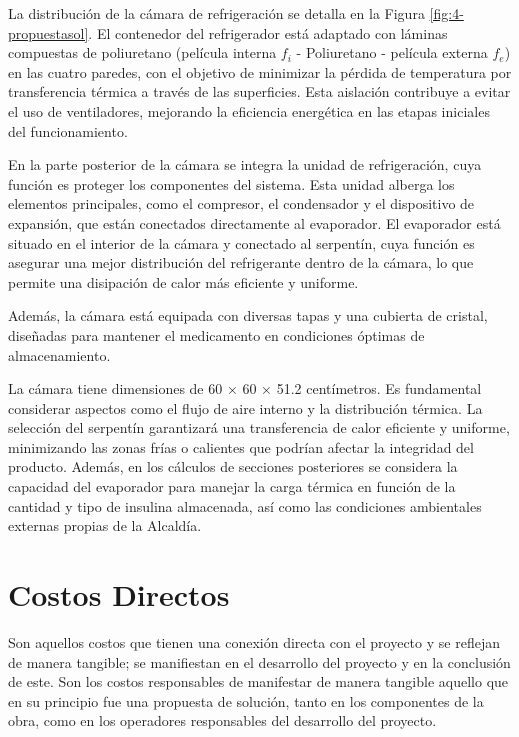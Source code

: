  
 

 \setcounter{chapter}{5}
 \setcounter{page}{111}   
 \setcounter{section}{0}
 \setcounter{figure}{0}
 \setcounter{table}{0}
La distribución de la cámara de refrigeración se detalla en la Figura \ref{fig:4-propuestasol}. El contenedor del refrigerador está adaptado con láminas compuestas de poliuretano (película interna $f_i$ - Poliuretano - película externa $f_e$) en las cuatro paredes, con el objetivo de minimizar la pérdida de temperatura por transferencia térmica a través de las superficies. Esta aislación contribuye a evitar el uso de ventiladores, mejorando la eficiencia energética en las etapas iniciales del funcionamiento.

En la parte posterior de la cámara se integra la unidad de refrigeración, cuya función es proteger los componentes del sistema. Esta unidad alberga los elementos principales, como el compresor, el condensador y el dispositivo de expansión, que están conectados directamente al evaporador. El evaporador está situado en el interior de la cámara y conectado al serpentín, cuya función es asegurar una mejor distribución del refrigerante dentro de la cámara, lo que permite una disipación de calor más eficiente y uniforme.

Además, la cámara está equipada con diversas tapas y una cubierta de cristal, diseñadas para mantener el medicamento en condiciones óptimas de almacenamiento.

La cámara tiene dimensiones de 60 × 60 × 51.2 centímetros. Es fundamental considerar aspectos como el flujo de aire interno y la distribución térmica. La selección del serpentín garantizará una transferencia de calor eficiente y uniforme, minimizando las zonas frías o calientes que podrían afectar la integridad del producto. Además, en los cálculos de secciones posteriores se considera la capacidad del evaporador para manejar la carga térmica en función de la cantidad y tipo de insulina almacenada, así como las condiciones ambientales externas propias de la Alcaldía.

 \section{Costos Directos}
 Son aquellos costos que tienen una conexión directa con el proyecto y se reflejan de manera tangible; se manifiestan en el desarrollo del proyecto y en la conclusión de este. Son los costos responsables de manifestar de manera tangible aquello que en su principio fue una propuesta de solución, tanto en los componentes de la obra, como en los operadores responsables del desarrollo del proyecto.
 
